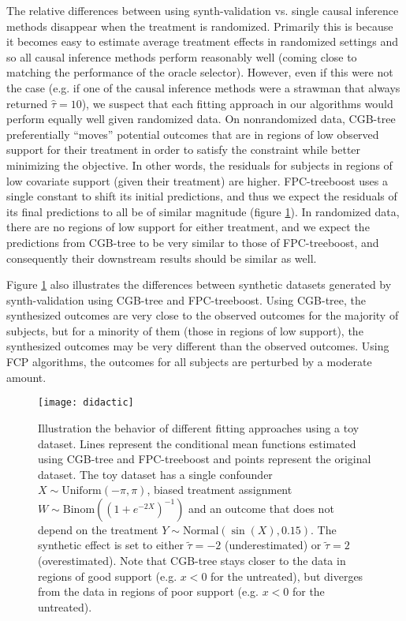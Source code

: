 The relative differences between using synth-validation vs. single causal inference methods disappear when the treatment is randomized. Primarily this is because it becomes easy to estimate average treatment effects in randomized settings and so all causal inference methods perform reasonably well (coming close to matching the performance of the oracle selector). However, even if this were not the case (e.g. if one of the causal inference methods were a strawman that always returned $\hat\tau=10$), we suspect that each fitting approach in our algorithms would perform equally well given randomized data. On nonrandomized data, CGB-tree preferentially ``moves'' potential outcomes that are in regions of low observed support for their treatment in order to satisfy the constraint while better minimizing the objective. In other words, the residuals for subjects in regions of low covariate support (given their treatment) are higher. FPC-treeboost uses a single constant to shift its initial predictions, and thus we expect the residuals of its final predictions to all be of similar magnitude (figure \ref{fig:didactic}). In randomized data, there are no regions of low support for either treatment, and we expect the predictions from CGB-tree to be very similar to those of FPC-treeboost, and consequently their downstream results should be similar as well. 

Figure \ref{fig:didactic} also illustrates the differences between synthetic datasets generated by synth-validation using CGB-tree and FPC-treeboost. Using CGB-tree, the synthesized outcomes are very close to the observed outcomes for the majority of subjects, but for a minority of them (those in regions of low support), the synthesized outcomes may be very different than the observed outcomes. Using FCP algorithms, the outcomes for all subjects are perturbed by a moderate amount. 

\begin{figure}[h!]
\centering
\texttt{[image: didactic]} 
\caption{Illustration the behavior of different fitting approaches using a toy dataset. Lines represent the conditional mean functions estimated using CGB-tree and FPC-treeboost and points represent the original dataset. The toy dataset has a single confounder $X \sim \text{Uniform}(-\pi, \pi)$, biased treatment assignment $W \sim \text{Binom}((1+e^{-2X})^{-1})$ and an outcome that does not depend on the treatment $Y\sim \text{Normal}(\sin(X), 0.15)$. The synthetic effect is set to either $\tilde\tau=-2$ (underestimated) or $\tilde\tau=2$ (overestimated). Note that CGB-tree stays closer to the data in regions of good support (e.g. $x<0$ for the untreated), but diverges from the data in regions of poor support (e.g. $x<0$ for the untreated).}
\label{fig:didactic}
\end{figure}

